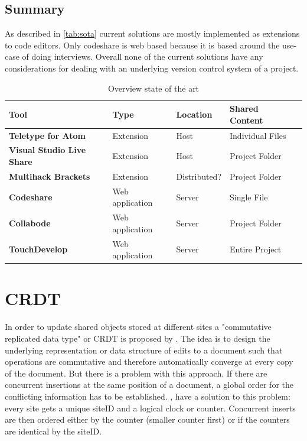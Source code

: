 \subsection{Summary}
As described in \autoref{tab:sota} current solutions are mostly implemented as extensions to code editors. Only codeshare is web based because it is based around the use-case of doing interviews. Overall none of the current solutions have any considerations for dealing with an underlying version control system of a project.

\begin{table}
	\centering
	\begin{tabular}{| >{\bfseries}l | l | l | l | l | }
		\hline
			\rowcolor{orange} \bfseries Tool & \bfseries Type & \bfseries Location & \bfseries Shared Content \\
		\hline
		\hline
			Teletype for Atom & Extension & Host & Individual Files \\\hline
			Visual Studio Live Share & Extension & Host & Project Folder \\\hline
			Multihack Brackets & Extension &  Distributed? & Project Folder \\\hline
			Codeshare & Web application & Server & Single File \\\hline
			Collabode & Web application & Server & Project Folder \\\hline
			TouchDevelop & Web application & Server & Entire Project \\
		\hline
	\end{tabular}
	\caption{Overview state of the art}
	\label{tab:sota}
\end{table}

\section{CRDT}
In order to update shared objects stored at different sites a "commutative replicated data type" or CRDT is proposed by \cite{PreguicaMarquesShapiroLetia:2009}. The idea is to design the underlying representation or data structure of edits to a document such that operations are commutative and therefore automatically converge at every copy of the document.
But there is a problem with this approach. If there are concurrent insertions at the same position of a document, a global order for the conflicting information has to be established. \cite{PreguicaMarquesShapiroLetia:2009},\cite{Oster:2006:DataconsistencyforP2Pcollaborativeediting} have a solution to this problem: every site gets a unique siteID and a logical clock or counter. Concurrent inserts are then ordered either by the counter (smaller counter first) or if the counters are identical by the siteID.

